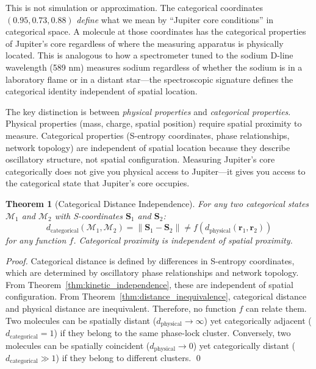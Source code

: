 \documentclass[12pt,a4paper]{article}
\newtheorem{theorem}{Theorem}[section]
\theoremstyle{definition}
\theoremstyle{remark}
\begin{document}
This is not simulation or approximation. The categorical coordinates $(0.95, 0.73, 0.88)$ \textit{define} what we mean by ``Jupiter core conditions'' in categorical space. A molecule at those coordinates has the categorical properties of Jupiter's core regardless of where the measuring apparatus is physically located. This is analogous to how a spectrometer tuned to the sodium D-line wavelength (589 nm) measures sodium regardless of whether the sodium is in a laboratory flame or in a distant star—the spectroscopic signature defines the categorical identity independent of spatial location.

The key distinction is between \textit{physical properties} and \textit{categorical properties}. Physical properties (mass, charge, spatial position) require spatial proximity to measure. Categorical properties (S-entropy coordinates, phase relationships, network topology) are independent of spatial location because they describe oscillatory structure, not spatial configuration. Measuring Jupiter's core categorically does not give you physical access to Jupiter—it gives you access to the categorical state that Jupiter's core occupies.

\begin{theorem}[Categorical Distance Independence]
\label{thm:categorical_distance_independence}
For any two categorical states $\mathcal{M}_1$ and $\mathcal{M}_2$ with S-coordinates $\mathbf{S}_1$ and $\mathbf{S}_2$:
\begin{equation}
d_{\text{categorical}}(\mathcal{M}_1, \mathcal{M}_2) = \|\mathbf{S}_1 - \mathbf{S}_2\| \neq f(d_{\text{physical}}(\mathbf{r}_1, \mathbf{r}_2))
\end{equation}
for any function $f$. Categorical proximity is independent of spatial proximity.
\end{theorem}

\begin{proof}
Categorical distance is defined by differences in S-entropy coordinates, which are determined by oscillatory phase relationships and network topology. From Theorem~\ref{thm:kinetic_independence}, these are independent of spatial configuration. From Theorem~\ref{thm:distance_inequivalence}, categorical distance and physical distance are inequivalent. Therefore, no function $f$ can relate them. Two molecules can be spatially distant ($d_{\text{physical}} \to \infty$) yet categorically adjacent ($d_{\text{categorical}} = 1$) if they belong to the same phase-lock cluster. Conversely, two molecules can be spatially coincident ($d_{\text{physical}} \to 0$) yet categorically distant ($d_{\text{categorical}} \gg 1$) if they belong to different clusters. \qed
\end{proof}
\end{document}
